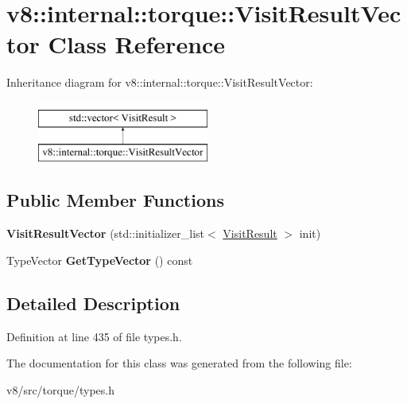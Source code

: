 \hypertarget{classv8_1_1internal_1_1torque_1_1VisitResultVector}{}\section{v8\+:\+:internal\+:\+:torque\+:\+:Visit\+Result\+Vector Class Reference}
\label{classv8_1_1internal_1_1torque_1_1VisitResultVector}
Inheritance diagram for v8\+:\+:internal\+:\+:torque\+:\+:Visit\+Result\+Vector\+:\begin{figure}[H]
\begin{center}
\leavevmode
\includegraphics[height=2.000000cm]{classv8_1_1internal_1_1torque_1_1VisitResultVector}
\end{center}
\end{figure}
\subsection*{Public Member Functions}
\begin{DoxyCompactItemize}
\item 
\mbox{\label{classv8_1_1internal_1_1torque_1_1VisitResultVector_afc8d424120227a96cfda385fee1fa313}} 
{\bfseries Visit\+Result\+Vector} (std\+::initializer\+\_\+list$<$ \mbox{\hyperlink{classv8_1_1internal_1_1torque_1_1VisitResult}{Visit\+Result}} $>$ init)
\item 
\mbox{\label{classv8_1_1internal_1_1torque_1_1VisitResultVector_af0fa9a510c82697f03e4158b3fa86e77}} 
Type\+Vector {\bfseries Get\+Type\+Vector} () const
\end{DoxyCompactItemize}


\subsection{Detailed Description}


Definition at line 435 of file types.\+h.



The documentation for this class was generated from the following file\+:\begin{DoxyCompactItemize}
\item 
v8/src/torque/types.\+h\end{DoxyCompactItemize}

